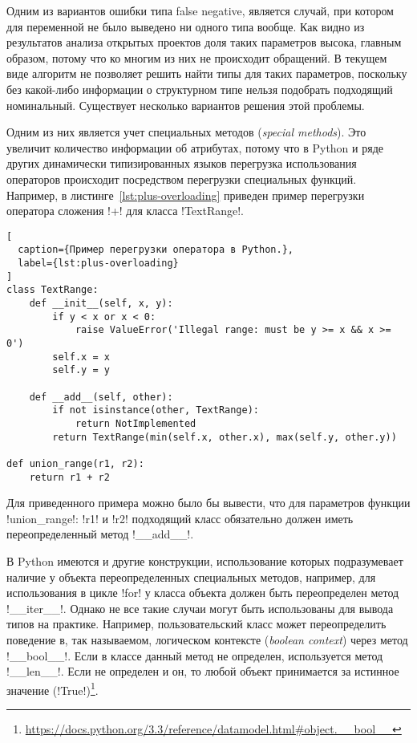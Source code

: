 Одним из вариантов ошибки типа false negative, является случай, при котором для
переменной не было выведено ни одного типа вообще.  Как видно из результатов
анализа открытых проектов доля таких параметров высока, главным образом, потому
что ко многим из них не происходит обращений. В текущем виде алгоритм не
позволяет решить найти типы для таких параметров, поскольку без какой-либо
информации о структурном типе нельзя подобрать подходящий номинальный.
Существует несколько вариантов решения этой проблемы. 

Одним из них является учет специальных методов (\emph{special methods}). Это
увеличит количество информации об атрибутах, потому что в Python и ряде других
динамически типизированных языков перегрузка использования операторов происходит
посредством перегрузки специальных функций.  Например, в
листинге~\ref{lst:plus-overloading} приведен пример перегрузки оператора
сложения !+! для класса !TextRange!.

\begin{lstlisting}[
  caption={Пример перегрузки оператора в Python.},
  label={lst:plus-overloading}
]
class TextRange:
    def __init__(self, x, y):
        if y < x or x < 0:
            raise ValueError('Illegal range: must be y >= x && x >= 0')
        self.x = x
        self.y = y

    def __add__(self, other):
        if not isinstance(other, TextRange):
            return NotImplemented
        return TextRange(min(self.x, other.x), max(self.y, other.y))

def union_range(r1, r2):
    return r1 + r2    

\end{lstlisting}

Для приведенного примера можно было бы вывести, что для параметров функции
!union_range!: !r1! и !r2! подходящий класс обязательно должен иметь
переопределенный метод !__add__!. 

В Python имеются и другие конструкции, использование которых подразумевает
наличие у объекта переопределенных специальных методов, например, для
использования в цикле !for! у класса объекта должен быть переопределен метод
!__iter__!. Однако не все такие случаи могут быть использованы для вывода типов
на практике. Например, пользовательский класс может переопределить поведение в,
так называемом, логическом контексте (\emph{boolean context}) через метод
!__bool__!. Если в классе данный метод не определен, используется метод
!__len__!. Если не определен и он, то любой объект принимается за истинное
значение
(!True!)\footnote{\url{https://docs.python.org/3.3/reference/datamodel.html\#object.\_\_bool\_\_}}.

